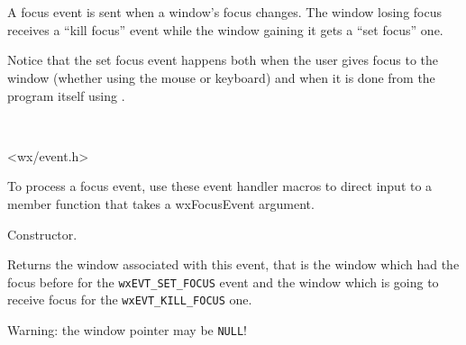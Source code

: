 \section{}\label{wxfocusevent}

A focus event is sent when a window's focus changes. The window losing focus
receives a ``kill focus'' event while the window gaining it gets a ``set
focus'' one.

Notice that the set focus event happens both when the user gives focus to the
window (whether using the mouse or keyboard) and when it is done from the
program itself using .


\\


<wx/event.h>




To process a focus event, use these event handler macros to direct input to a member
function that takes a wxFocusEvent argument.

\twocolwidtha{7cm}
\begin{twocollist}\itemsep=0pt
\end{twocollist}%





\label{wxfocuseventctor}


Constructor.


\label{wxfocuseventgetwindow}

Returns the window associated with this event, that is the window which had the
focus before for the \texttt{wxEVT\_SET\_FOCUS} event and the window which is
going to receive focus for the \texttt{wxEVT\_KILL\_FOCUS} one.

Warning: the window pointer may be \texttt{NULL}!

